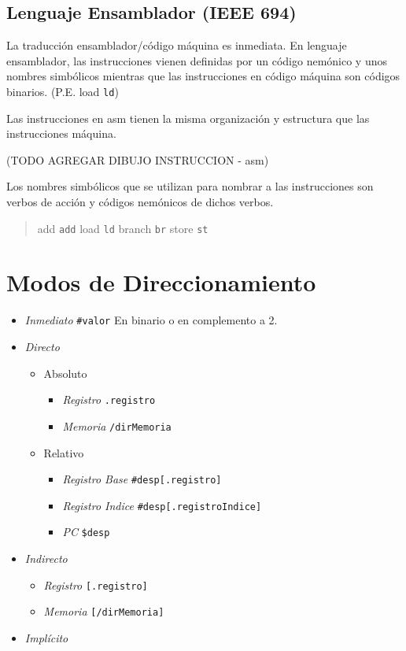 \documentclass[a4paper,11pt,spanish]{report}
\begin{document}
\subsection{Lenguaje Ensamblador (IEEE 694)}
La traducción ensamblador/código máquina es inmediata. En lenguaje ensamblador, las instrucciones vienen definidas por un código nemónico y unos nombres simbólicos mientras que las instrucciones en código máquina son códigos binarios. (P.E. load \textrightarrow \verb|ld|)

Las instrucciones en asm tienen la misma organización y estructura que las instrucciones máquina.

(TODO AGREGAR DIBUJO INSTRUCCION - asm)

Los nombres simbólicos que se utilizan para nombrar a las instrucciones son verbos de acción y códigos nemónicos de dichos verbos.
\begin{quote}
add \textrightarrow \verb|add|	load \textrightarrow \verb|ld|
branch \textrightarrow \verb|br|	store \textrightarrow \verb|st|
\end{quote}
 
\section{Modos de Direccionamiento}
\begin{itemize}
\item \emph{Inmediato} \verb|#valor| \textrightarrow En binario o en complemento a 2.
\item \emph{Directo} 
	\begin{itemize}
	\item Absoluto
		\begin{itemize}
		\item \emph{Registro} \verb|.registro|
		\item \emph{Memoria} \verb|/dirMemoria|
		\end{itemize}
	\item Relativo
		\begin{itemize}
		\item \emph{Registro Base} \verb|#desp[.registro]|
		\item \emph{Registro Indice} \verb|#desp[.registroIndice]|
		\item \emph{PC} \verb|$desp|
		\end{itemize}
	\end{itemize}
\item \emph{Indirecto}
	\begin{itemize}
	\item \emph{Registro} \verb|[.registro]|
	\item \emph{Memoria} \verb|[/dirMemoria]|
	\end{itemize}
\item \emph{Implícito}
\end{itemize}
\end{document}

